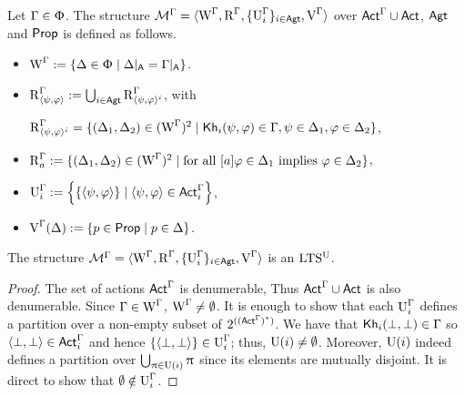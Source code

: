 \medskip

\begin{definition}\label{def:cm-ults-khiml}
Let $\Gamma \in \Upphi$. The structure $\mathcal{M}^\Gamma=\langle \operatorname{W}^\Gamma, \operatorname{R}^\Gamma, \{ \operatorname{U}^\Gamma_i \}_{i \in {\rm \sf Agt}}, \operatorname{V}^\Gamma \rangle$ over ${\rm \sf Act}^\Gamma \cup {\rm \sf Act}$, ${\rm \sf Agt}$ and ${\rm \sf Prop}$ is defined as follows.
\begin{itemize}
\item $\operatorname{W}^\Gamma := \{ \Delta \in \Upphi \mid \Delta\vert_{{\sf A}} = \Gamma\vert_{{\sf A}} \}$.

\item $\operatorname{R}^{\Gamma}_{\langle \psi,\varphi \rangle} := \bigcup_{i \in {\rm \sf Agt}} \operatorname{R}^{\Gamma} _{\langle \psi,\varphi \rangle^i}$, with
\begin{center}
$\operatorname{R}^{\Gamma}_{\langle \psi,\varphi \rangle^i} = \{ (\Delta_1, \Delta_2) \in (\operatorname{W}^\Gamma)^2 \mid {\sf Kh}_i(\psi,\varphi) \in \Gamma, \psi \in \Delta_1, \varphi \in \Delta_2 \}$,
\end{center}

\item $\operatorname{R}^{\Gamma}_a := \{ (\Delta_1, \Delta_2) \in (\operatorname{W}^\Gamma)^2 \mid \text{for all } [a]\varphi \in \Delta_1 \text{ implies } \varphi \in \Delta_2 \}$,

\item $\operatorname{U}^\Gamma_i := \left\{ \{ \langle \psi,\varphi \rangle \} \mid \langle \psi,\varphi \rangle \in {\rm \sf Act}^\Gamma_i \right\}$,

\item $\operatorname{V}^\Gamma(\Delta) := \{ p \in {\rm \sf Prop} \mid p \in \Delta \}$.
\end{itemize}
\end{definition}

\medskip

\begin{proposition}\label{pro:cm-ults-khiml}
The structure $\mathcal{M}^\Gamma = \langle \operatorname{W}^\Gamma, \operatorname{R}^\Gamma, \{ \operatorname{U}^\Gamma_i \}_{i \in {\rm \sf Agt}}, \operatorname{V}^\Gamma \rangle$ is an $\textup{LTS$^\text{\textup{U}}$}$.
\end{proposition}
\begin{proof}
The set of actions ${\rm \sf Act}^\Gamma$ is denumerable, Thus ${\rm \sf Act}^\Gamma\cup{\rm \sf Act}$ is also denumerable.
Since $\Gamma \in \operatorname{W}^\Gamma$, $\operatorname{W}^\Gamma \neq \emptyset$.
It is enough to show that each $\operatorname{U}^\Gamma_i$ defines a partition over a non-empty subset of $2^{(({\rm \sf Act}^\Gamma)^*)}$.
We have that ${\sf Kh}_i(\bot,\bot) \in \Gamma$ so $\langle \bot, \bot \rangle \in {\rm \sf Act}^\Gamma_i$ and hence $\{ \langle \bot, \bot \rangle \} \in \operatorname{U}^\Gamma_i$; thus, $\operatorname{U}(i) \neq \emptyset$.
Moreover, $\operatorname{U}(i)$ indeed defines a partition over $\bigcup_{\uppi \in \operatorname{U}(i)} \uppi$ since its elements are mutually disjoint.
It is direct to show that $\emptyset \notin \operatorname{U}^\Gamma_i$.
\end{proof}

